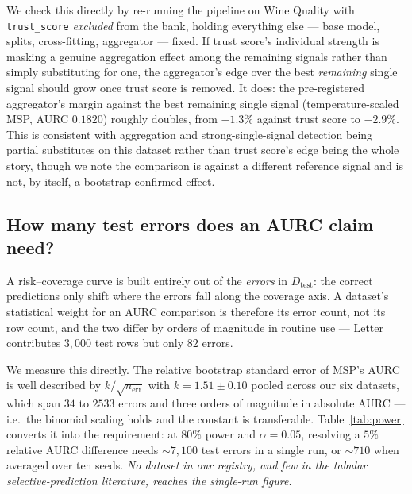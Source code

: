 \documentclass[conference]{IEEEtran}
\begin{document}
We check this directly by re-running the pipeline on Wine Quality with
\texttt{trust\_score} \emph{excluded} from the bank, holding everything
else --- base model, splits, cross-fitting, aggregator --- fixed. If
trust score's individual strength is masking a genuine aggregation effect
among the remaining signals rather than simply substituting for one, the
aggregator's edge over the best \emph{remaining} single signal should
grow once trust score is removed. It does: the pre-registered
aggregator's margin against the best remaining single signal
(temperature-scaled MSP, AURC $0.1820$) roughly doubles, from $-1.3\%$
against trust score to $-2.9\%$. This is consistent with aggregation and
strong-single-signal detection being partial substitutes on this dataset
rather than trust score's edge being the whole story, though we note the
comparison is against a different reference signal and is not,
by itself, a bootstrap-confirmed effect.

\subsection{How many test errors does an AURC claim need?}
\label{sec:power}

A risk--coverage curve is built entirely out of the \emph{errors} in
$D_{\mathrm{test}}$: the correct predictions only shift where the errors
fall along the coverage axis. A dataset's statistical weight for an AURC
comparison is therefore its error count, not its row count, and the two
differ by orders of magnitude in routine use --- Letter contributes
$3{,}000$ test rows but only $82$ errors.

We measure this directly. The relative bootstrap standard error of MSP's
AURC is well described by $k/\sqrt{n_{\mathrm{err}}}$ with
$k = 1.51 \pm 0.10$ pooled across our six datasets, which span $34$ to
$2533$ errors and three orders of magnitude in absolute AURC --- i.e.\ the
binomial scaling holds and the constant is transferable.
Table~\ref{tab:power} converts it into the requirement: at $80\%$ power
and $\alpha = 0.05$, resolving a $5\%$ relative AURC difference needs
${\sim}7{,}100$ test errors in a single run, or ${\sim}710$ when averaged
over ten seeds. \emph{No dataset in our registry, and few in the tabular
selective-prediction literature, reaches the single-run figure.}
\end{document}
